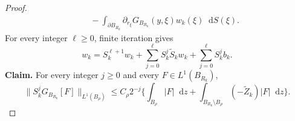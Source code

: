 \documentclass[11pt]{article}
\numberwithin{equation}{section}
\theoremstyle{remark}
\newcommand{\dd}{\mathop{}\!\mathrm{d}}
\begin{document}
\begin{proof}
{\begin{equation}
\begin{aligned}
 &\quad-\int_{\partial B_{R_k}}\partial_{r_\xi}G_{B_{R_k}}(y,\xi)
                 w_k(\xi)\dd S(\xi).
 \end{aligned}
\end{equation}
}
For every integer $\ell\ge0$, finite iteration gives
{
\begin{equation}\label{eq:finite-green-iteration}
 w_k=S_k^{\ell+1}w_k
     +\sum_{j=0}^{\ell}S_k^j\widetilde S_kw_k
     +\sum_{j=0}^{\ell}S_k^jb_k.
\end{equation}
}
\textbf{Claim.}  For every integer $j\ge0$ and every
$F\in L^1(B_{R_k})$,
{
\begin{equation}\label{eq:iterated-green-estimate}
 \|S_k^jG_{B_{R_k}}[F]\|_{L^1(B_\rho)}
 \le C_\rho 2^{-j}\bigg\{
   \int_{B_\rho}|F|\dd z
   +\int_{B_{R_k}\setminus B_\rho}(-\widetilde Z_k)|F|\dd z\bigg\}.
\end{equation}
}


\end{proof}
\end{document}
